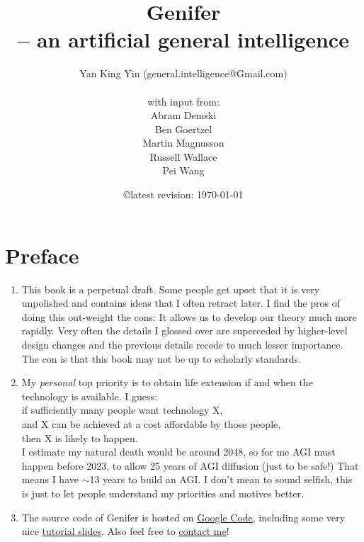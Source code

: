 \documentclass[12pt, a4paper]{report}
\title{\textbf{Genifer\\-- an artificial general intelligence}}
\author{Yan King Yin (general.intelligence@Gmail.com)\\ \\
with input from:\\
Abram Demski\\
Ben Goertzel\\
Martin Magnusson\\
Russell Wallace\\
Pei Wang
}
\date{\copyright \quad latest revision: \today}
\begin{document}
\renewcommand{\normalsize}{\fontsize{13pt}{15pt}\selectfont}
\fontsize{13pt}{15pt} \selectfont


\maketitle
\dominitoc
\tableofcontents

\setcounter{chapter}{-1}
\chapter{Preface}

\begin{enumerate}

\item  This book is a perpetual draft.  Some people get upset that it is very unpolished and contains ideas that I often retract later.  I find the pros of doing this out-weight the cons:  It allows us to develop our theory much more rapidly.  Very often the details I glossed over are superceded by higher-level design changes and the previous details recede to much lesser importance.  The con is that this book may not be up to scholarly standards.

\item  My \textit{personal} top priority is to obtain life extension if and when the technology is available.  I guess:\\
\hspace*{1cm} if sufficiently many people want technology X,\\
\hspace*{1cm} and X can be achieved at a cost affordable by those people,\\
\hspace*{1cm} then X is likely to happen.\\
I estimate my natural death would be around 2048, so for me AGI must happen before 2023, to allow 25 years of AGI diffusion (just to be safe!)  That means I have $\sim$13 years to build an AGI.  I don't mean to sound selfish, this is just to let people understand my priorities and motives better.

\item  The source code of $\mbox{Genifer}$ is hosted on \href{http://code.google.com/p/genifer/}{Google Code}, including some very nice \href{http://code.google.com/p/genifer/downloads/list}{tutorial slides}.  Also feel free to \href{mailto:Generic.Intelligence@Gmail.com}{contact me}!

\end{enumerate}
\end{document}
